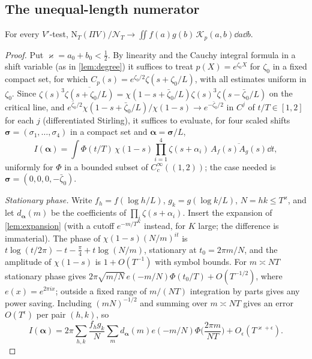 \documentclass[11pt,colorlinks]{charlie}
\begin{document}
\subsection{The unequal-length numerator}
\begin{proposition}\label{prop:unequal}
For every $V'$-test, $\mathrm N_T(\Pi V)/\mathcal N_T\to\iint f(a)g(b)\,\mathcal K_p(a,b)\dd a\dd b$.
\end{proposition}
\begin{proof}
Put $\varkappa=a_0+b_0<\frac12$. By linearity and the Cauchy integral formula in a shift variable (as in \cref{lem:degree}) it suffices to treat $p(X)=e^{\zeta_0X}$ for $\zeta_0$ in a fixed compact set, for which $C_p(s)=e^{\zeta_0/2}\zeta(s+\zeta_0/L)$, with all estimates uniform in $\zeta_0$. Since $\zeta(s)^3\overline{\zeta(s+\zeta_0/L)}=\chi(1-s+\bar\zeta_0/L)\zeta(s)^3\zeta(s-\bar\zeta_0/L)$ on the critical line, and $e^{\bar\zeta_0/2}\chi(1-s+\bar\zeta_0/L)/\chi(1-s)\to e^{-\bar\zeta_0/2}$ in $C^j$ of $t/T\in[1,2]$ for each $j$ (differentiated Stirling), it suffices to evaluate, for four scaled shifts $\boldsymbol\sigma=(\sigma_1,\dots,\sigma_4)$ in a compact set and $\boldsymbol\alpha=\boldsymbol\sigma/L$,
\[
 I(\boldsymbol\alpha)=\int\Phi(t/T)\,\chi(1-s)\prod_{i=1}^4\zeta(s+\alpha_i)\,\overline{A_f(s)A_g(s)}\dd t,
\]
uniformly for $\Phi$ in a bounded subset of $C_c^\infty((1,2))$; the case needed is $\boldsymbol\sigma=(0,0,0,-\bar\zeta_0)$.

\emph{Stationary phase.} Write $f_h=f(\log h/L)$, $g_k=g(\log k/L)$, $N=hk\le T^{\varkappa}$, and let $d_{\boldsymbol\alpha}(m)$ be the coefficients of $\prod_i\zeta(s+\alpha_i)$. Insert the expansion of \cref{lem:expansion} (with a cutoff $e^{-m/T^{K}}$ instead, for $K$ large; the difference is immaterial). The phase of $\chi(1-s)(N/m)^{it}$ is $t\log(t/2\pi)-t-\frac\pi4+t\log(N/m)$, stationary at $t_0=2\pi m/N$, and the amplitude of $\chi(1-s)$ is $1+O(T^{-1})$ with symbol bounds. For $m\asymp NT$ stationary phase gives $2\pi\sqrt{m/N}\,e(-m/N)\Phi(t_0/T)+O(T^{-1/2})$, where $e(x)=e^{2\pi ix}$; outside a fixed range of $m/(NT)$ integration by parts gives any power saving. Including $(mN)^{-1/2}$ and summing over $m\asymp NT$ gives an error $O(T^\epsilon)$ per pair $(h,k)$, so
\begin{equation}\label{eq:saddle}
 I(\boldsymbol\alpha)=2\pi\sum_{h,k}\frac{f_hg_k}{N}\sum_md_{\boldsymbol\alpha}(m)e(-m/N)\Phi\Big(\frac{2\pi m}{NT}\Big)+O_\epsilon(T^{\varkappa+\epsilon}).
\end{equation}


\end{proof}
\end{document}
